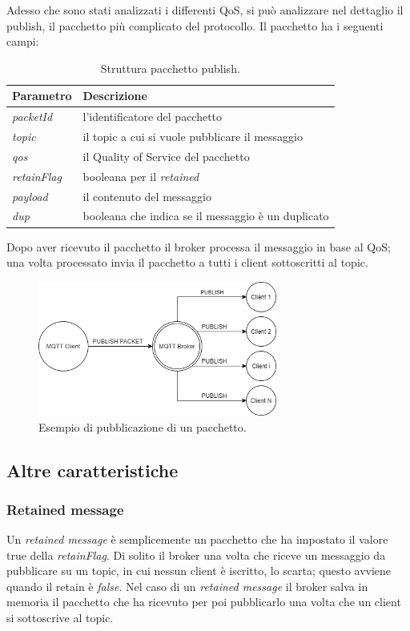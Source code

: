 \documentclass[binding=0.6cm,TFA]{sapthesis}
\begin{document}
\begin{large}
Adesso che sono stati analizzati i differenti QoS, si può analizzare nel dettaglio il publish, il pacchetto più complicato del protocollo.
Il pacchetto ha i seguenti campi:
\begin{table}[h]
\caption{Struttura pacchetto publish.}
\label{tab:publish}
\begin{tabular}{lp{}}
\toprule
\textbf{Parametro} & \textbf{Descrizione} \\
\midrule
\textit{packetId} & l'identificatore del pacchetto \\
\textit{topic} & il topic a cui si vuole pubblicare il messaggio \\
\textit{qos} & il Quality of Service del pacchetto \\
\textit{retainFlag} & booleana per il \textit{retained} \\
\textit{payload} & il contenuto del messaggio \\
\textit{dup} & booleana che indica se il messaggio è un duplicato \\
\bottomrule
\end{tabular}
\end{table}

Dopo aver ricevuto il pacchetto il broker processa il messaggio in base al QoS; una volta processato invia il pacchetto a tutti i client sottoscritti al topic.

\begin{figure}[h]
\centering
\includegraphics[width=0.7\textwidth]{images/publish-flow-example.png}
\caption{Esempio di pubblicazione di un pacchetto.}
\label{fig:publish-flow-example}
\end{figure}

\subsection{Altre caratteristiche}
\subsubsection{Retained message}
Un \textit{retained message} è semplicemente un pacchetto che ha impostato il valore true della \textit{retainFlag}. Di solito il broker una volta che riceve un messaggio da pubblicare su un topic, in cui nessun client è iscritto, lo scarta; questo avviene quando il retain è \textit{false}. Nel caso di un \textit{retained message} il broker salva in memoria il pacchetto che ha ricevuto per poi pubblicarlo una volta che un client si sottoscrive al topic.


\end{large}
\end{document}
